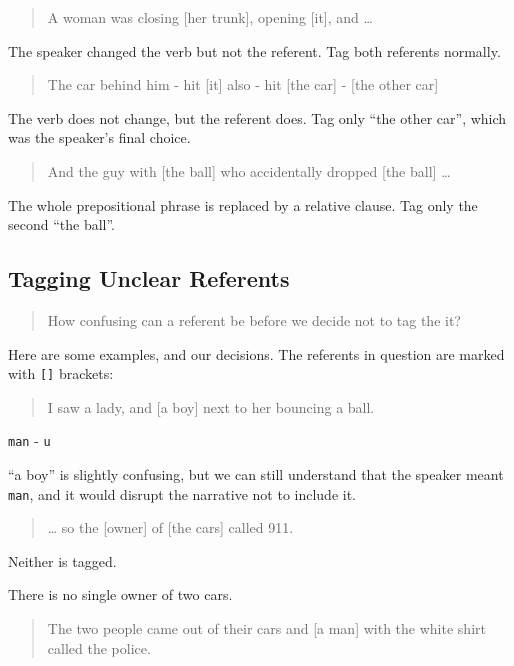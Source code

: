 \documentclass[
]{book}
\begin{document}
\begin{quote}
A woman was closing {[}her trunk{]}, opening {[}it{]}, and \ldots{}
\end{quote}

The speaker changed the verb but not the referent.
Tag both referents normally.

\begin{quote}
The car behind him - hit {[}it{]} also - hit {[}the car{]} - {[}the other car{]}
\end{quote}

The verb does not change, but the referent does.
Tag only ``the other car'', which was the speaker's final choice.

\begin{quote}
And the guy with {[}the ball{]} who accidentally dropped {[}the ball{]} \ldots{}
\end{quote}

The whole prepositional phrase is replaced by a relative clause.
Tag only the second ``the ball''.

\hypertarget{tagging-unclear-referents}{%
\subsection{Tagging Unclear Referents}\label{tagging-unclear-referents}}

\begin{quote}
How confusing can a referent be before we decide not to tag the it?
\end{quote}

Here are some examples, and our decisions.
The referents in question are marked with \texttt{{[}{]}} brackets:

\begin{quote}
I saw a lady, and {[}a boy{]} next to her bouncing a ball.
\end{quote}

\texttt{man} - \texttt{u}

``a boy'' is slightly confusing,
but we can still understand that the speaker meant \texttt{man},
and it would disrupt the narrative not to include it.

\begin{quote}
\ldots{} so the {[}owner{]} of {[}the cars{]} called 911.
\end{quote}

Neither is tagged.

There is no single owner of two cars.

\begin{quote}
The two people came out of their cars and {[}a man{]} with the white shirt called the police.
\end{quote}
\end{document}
